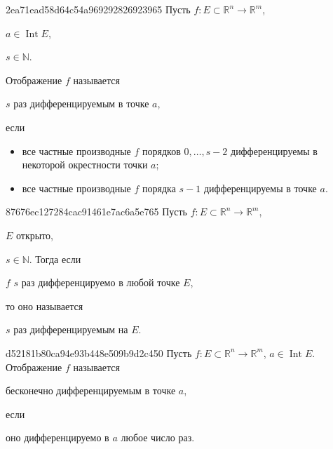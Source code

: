 \begin{note}{2ea71ead58d64c54a969292826923965}
    Пусть \({ f : E \subset \mathbb R^{n} \to \mathbb R^{m} }\),\: \begin{icloze}{4}\({ a \in \operatorname{Int} E }\),\end{icloze}\: \begin{icloze}{3}\({ s \in \mathbb N }\).\end{icloze}
    Отображение \({ f }\) называется \begin{icloze}{3}\({ s }\) раз дифференцируемым в точке \({ a }\),\end{icloze} если
    \begin{itemize}
        \item \begin{icloze}{1}все частные производные \({ f }\) порядков \({ 0, \ldots, s - 2 }\) дифференцируемы в некоторой окрестности точки \({ a }\);\end{icloze}
        \item \begin{icloze}{2}все частные производные \({ f }\) порядка \({ s - 1 }\) дифференцируемы в точке \({ a }\).\end{icloze}
    \end{itemize}
\end{note}

\begin{note}{87676ec127284cac91461e7ac6a5e765}
    Пусть \({ f : E \subset \mathbb R^{n} \to \mathbb R^{m} }\),\: \begin{icloze}{3}\({ E }\) открыто,\end{icloze}\: \({ s \in \mathbb N }\).
    Тогда если \begin{icloze}{2}\({ f }\) \({ s }\) раз дифференцируемо в любой точке \({ E }\),\end{icloze} то оно называется \begin{icloze}{1}\({ s }\) раз дифференцируемым на \({ E }\).\end{icloze}
\end{note}

\begin{note}{d52181b80ca94e93b448e509b9d2c450}
    Пусть \({ f : E \subset \mathbb R^{n} \to \mathbb R^{m} }\),\: \({ a \in \operatorname{Int} E }\).
    Отображение \({ f }\) называется \begin{icloze}{2}бесконечно дифференцируемым в точке \({ a }\),\end{icloze} если \begin{icloze}{1}оно дифференцируемо в \({ a }\) любое число раз.\end{icloze}
\end{note}

